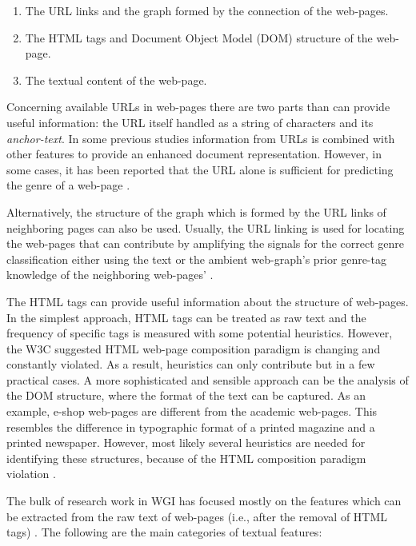 \begin{itemize}
\begin{enumerate}
\item The URL links and the graph formed by the connection of the web-pages.
\item The HTML tags and Document Object Model (DOM) structure of the web-page. 
\item The textual content of the web-page.
\end{enumerate}

Concerning available URLs in web-pages there are two parts than can provide useful information: the URL itself handled as a string of characters and its \textit{anchor-text}. In some previous studies information from URLs is combined with other features to provide an enhanced document representation. However, in some cases, it has been reported that the URL alone is sufficient for predicting the genre of a web-page \parencite{abramson2012_URL,asheghi2014semi,jebari2014pureURL,priyatam2013don_URL,zhu2011enhance}.

Alternatively, the structure of the graph which is formed by the URL links of neighboring pages can also be used. Usually, the URL linking is used for locating the web-pages that can contribute by amplifying the signals for the correct genre classification either using the text or the ambient web-graph's prior genre-tag knowledge of the neighboring web-pages' \parencite{abramson2012_URL,asheghi2014semi,jebari2014pureURL,priyatam2013don_URL,zhu2011enhance}.

The HTML tags can provide useful information about the structure of web-pages. In the simplest approach, HTML tags can be treated as raw text and the frequency of specific tags is measured with some potential heuristics. However, the W3C suggested HTML web-page composition paradigm is changing and constantly violated. As a result, heuristics can only contribute but in a few practical cases. A more sophisticated and sensible approach can be the analysis of the DOM structure, where the format of the text can be captured. As an example, e-shop web-pages are different from the academic web-pages. This resembles the difference in typographic format of a printed magazine and a printed newspaper. However, most likely several heuristics are needed for identifying these structures, because of the HTML composition paradigm violation \parencite{mehler2011integrating,mehler2011integrating}.

The bulk of research work in WGI has focused mostly on the features which can be extracted from the raw text of web-pages (i.e., after the removal of HTML tags) \parencite{mason2009classifying,sharoff2010web,Sharroff2010,Nooralahzadeh2014,onan2018ensemble}. The following are the main categories of textual features: 


\end{itemize}
